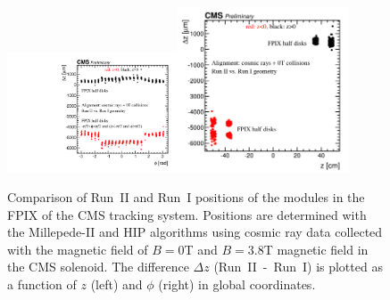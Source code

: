 \begin{figure}[htb]
    \begin{center}
        \includegraphics[width=0.45\textwidth]{../figs/Alignment/AlRes_phi_vs_dz_PXF_1.pdf}\includegraphics[width=0.45\textwidth]{../figs/Alignment/AlRes_z_vs_dz_PXF_1.png}
    \end{center}
    \caption{Comparison of Run~II and Run~I positions of the modules in the FPIX of the CMS tracking system. Positions are determined with the Millepede-II and HIP algorithms using cosmic ray data collected with the magnetic field of $B=0$T and $B=3.8$T magnetic field in the CMS solenoid. The difference $\Delta z$ (Run~II~-~Run~I) is plotted as a function of $z$ (left) and $\phi$ (right) in global coordinates.}
    \label{fig:GCP_FPIX}
\end{figure}

